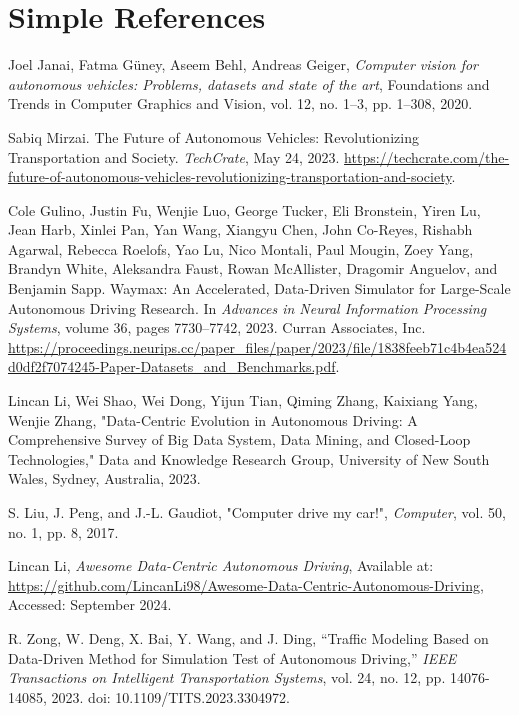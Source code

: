\documentclass[lettersize,journal]{IEEEtran}
\begin{document}
\section{Simple References}

\begin{thebibliography}{1}


Joel Janai, Fatma G{\"u}ney, Aseem Behl, Andreas Geiger,
\textit{Computer vision for autonomous vehicles: Problems, datasets and state of the art},
Foundations and Trends{\textregistered} in Computer Graphics and Vision, 
vol. 12, no. 1--3, pp. 1--308, 2020.

Sabiq Mirzai.
\newblock The Future of Autonomous Vehicles: Revolutionizing Transportation and Society.
\newblock \emph{TechCrate}, May 24, 2023.
\newblock \url{https://techcrate.com/the-future-of-autonomous-vehicles-revolutionizing-transportation-and-society}.


Cole Gulino, Justin Fu, Wenjie Luo, George Tucker, Eli Bronstein, Yiren Lu, Jean Harb, Xinlei Pan, Yan Wang, Xiangyu Chen, John Co-Reyes, Rishabh Agarwal, Rebecca Roelofs, Yao Lu, Nico Montali, Paul Mougin, Zoey Yang, Brandyn White, Aleksandra Faust, Rowan McAllister, Dragomir Anguelov, and Benjamin Sapp.
\newblock Waymax: An Accelerated, Data-Driven Simulator for Large-Scale Autonomous Driving Research.
\newblock In \emph{Advances in Neural Information Processing Systems}, volume 36, pages 7730--7742, 2023.
\newblock Curran Associates, Inc.
\newblock \url{https://proceedings.neurips.cc/paper_files/paper/2023/file/1838feeb71c4b4ea524d0df2f7074245-Paper-Datasets_and_Benchmarks.pdf}.

Lincan Li, Wei Shao, Wei Dong, Yijun Tian, Qiming Zhang, Kaixiang Yang, Wenjie Zhang, 
"Data-Centric Evolution in Autonomous Driving: A Comprehensive Survey of Big Data System, Data Mining, and Closed-Loop Technologies," 
Data and Knowledge Research Group, University of New South Wales, Sydney, Australia, 2023.


S. Liu, J. Peng, and J.-L. Gaudiot, "Computer drive my car!", \textit{Computer}, vol. 50, no. 1, pp. 8, 2017.

Lincan Li, \textit{Awesome Data-Centric Autonomous Driving}, Available at: \url{https://github.com/LincanLi98/Awesome-Data-Centric-Autonomous-Driving}, Accessed: September 2024.

R. Zong, W. Deng, X. Bai, Y. Wang, and J. Ding, ``Traffic Modeling Based on Data-Driven Method for Simulation Test of Autonomous Driving,'' \textit{IEEE Transactions on Intelligent Transportation Systems}, vol. 24, no. 12, pp. 14076-14085, 2023. doi: 10.1109/TITS.2023.3304972.


\end{thebibliography}
\end{document}
